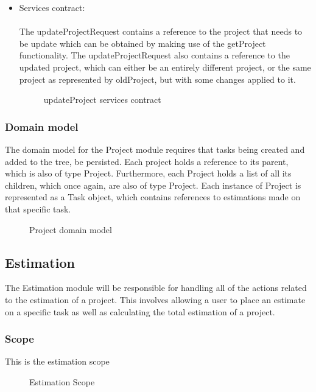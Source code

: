 \begin{itemize}
	\item Services contract:\\ \\
	The updateProjectRequest contains a reference to the project that needs to be update which can be obtained by making use of the getProject functionality. The updateProjectRequest also contains a reference to the updated project, which can either be an entirely different project, or the same project as represented by oldProject, but with some changes applied to it.
	\begin{figure}[H]
    	\centering
    	\caption{updateProject services contract}
    	\label{fig:updateProject_services_contract}
   	\end{figure}
\end{itemize}

\subsubsection{Domain model}
The domain model for the Project module requires that tasks being created and added to the tree, be persisted. Each project holds a reference to its parent, which is also of type Project. Furthermore, each Project holds a list of all its children, which once again, are also of type Project. Each instance of Project is represented as a Task object, which contains references to estimations made on that specific task.
\begin{figure}[H]
	\centering
	\caption{Project domain model}
	\label{fig:Project_domain_model}
\end{figure}

\subsection{Estimation}
	The Estimation module will be responsible for handling all of the actions related to the estimation of a project. This involves allowing a user to place an estimate on a specific task as well as calculating the total estimation of a project.
\subsubsection{Scope}
	This is the estimation scope
	\begin{figure}[H]
	    	\centering
	    	\caption{Estimation Scope}
	    	\label{fig:Estimation_Scope}
   	\end{figure}

